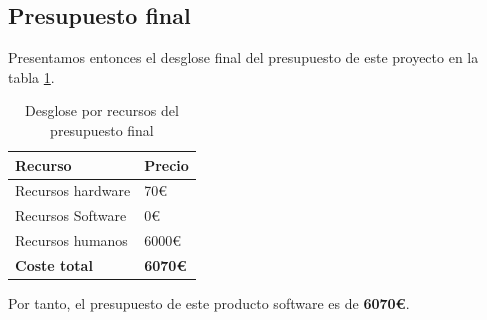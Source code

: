 \subsection*{Presupuesto final}

Presentamos entonces el desglose final del presupuesto de este proyecto en la tabla \ref{tab:presupuestos}.

\begin{table}[ht]
    \centering
    \begin{tabular}{ll}
    \hline
    \textbf{Recurso}     & \textbf{Precio} \\ \hline
    Recursos hardware    & 70€             \\ \hline
    Recursos Software    & 0€              \\ \hline
    Recursos humanos     & 6000€           \\ \hline
    \textbf{Coste total} & \textbf{6070€}  \\ \hline
    \end{tabular}
    \caption{Desglose por recursos del presupuesto final}
    \label{tab:presupuestos}
\end{table}

Por tanto, el presupuesto de este producto software es de \textbf{6070€}.